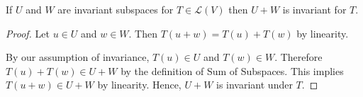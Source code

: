 If $U$ and $W$ are invariant subspaces for $T \in \mathcal{L}(V)$ then $U+W$ is invariant for $T$.
\begin{mybox}
\begin{proof}
    Let $u \in U$ and $w \in W$. Then $T(u + w) = T(u) + T(w)$ by linearity. 

    \nl By our assumption of invariance, $T(u) \in U$ and $T(w) \in W$. Therefore\\$T(u) + T(w) \in U + W$ by the definition of Sum of Subspaces. This implies $T(u + w) \in U + W$ by linearity. Hence, $U + W$ is invariant under $T$.
\end{proof}
\end{mybox}